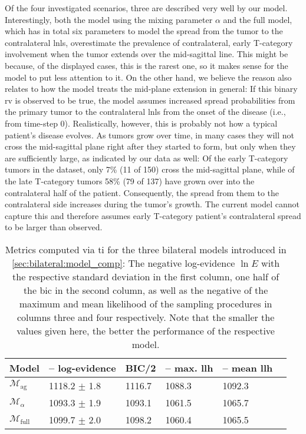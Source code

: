 \documentclass[\relativeRoot/main.tex]{subfiles}
\begin{document}
Of the four investigated scenarios, three are described very well by our model. Interestingly, both the model using the mixing parameter $\alpha$ and the full model, which has in total six parameters to model the spread from the tumor to the contralateral \glspl{lnl}, overestimate the prevalence of contralateral, early T-category involvement when the tumor extends over the mid-sagittal line. This might be because, of the displayed cases, this is the rarest one, so it makes sense for the model to put less attention to it. On the other hand, we believe the reason also relates to how the model treats the mid-plane extension in general: If this binary \gls{rv} is observed to be true, the model assumes increased spread probabilities from the primary tumor to the contralateral \glspl{lnl} from the onset of the disease (i.e., from time-step 0). Realistically, however, this is probably not how a typical patient's disease evolves. As tumors grow over time, in many cases they will not cross the mid-sagittal plane right after they started to form, but only when they are sufficiently large, as indicated by our data as well: Of the early T-category tumors in the dataset, only 7\% (11 of 150) cross the mid-sagittal plane, while of the late T-category tumors 58\% (79 of 137) have grown over into the contralateral half of the patient. Consequently, the spread from them to the contralateral side increases during the tumor's growth. The current model cannot capture this and therefore assumes early T-category patient's contralateral spread to be larger than observed.

\begin{table}
    \centering
    \begin{tabular}{|l|l|l|l|l|l|}
        \hline
        \textbf{Model} & \textbf{-- log-evidence} & \textbf{BIC/2} & \textbf{-- max. llh} & \textbf{-- mean llh} \\
        \hline
        $\mathcal{M}_\text{ag}$ & 1118.2 $\pm$ 1.8 & 1116.7 & 1088.3 & 1092.3 \\
        $\mathcal{M}_\alpha$ & 1093.3 $\pm$ 1.9 & 1093.1 & 1061.5 & 1065.7 \\
        $\mathcal{M}_\text{full}$ & 1099.7 $\pm$ 2.0 & 1098.2 & 1060.4 & 1065.5 \\
        \hline
    \end{tabular}
    \caption[
        Metrics for assessing three bilateral models
    ]{
        Metrics computed via \gls{ti} for the three bilateral models introduced in \cref{sec:bilateral:model_comp}: The negative log-evidence $\ln{E}$ with the respective standard deviation in the first column, one half of the \gls{bic} in the second column, as well as the negative of the maximum and mean likelihood of the sampling procedures in columns three and four respectively. Note that the smaller the values given here, the better the performance of the respective model.
    }
    \label{table:bilateral:model_comp:evidences}
\end{table}
\end{document}
